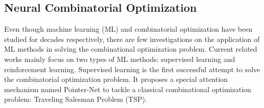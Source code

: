 \subsection{Neural Combinatorial Optimization}
\label{sec:nco_related}
Even though machine learning (ML) and combinatorial optimization have been studied for decades respectively, 
there are few investigations on the application of ML methods in solving the combinational optimization problem.
Current related works mainly focus on two types of ML methods: supervised learning and reinforcement learning.
Supervised learning \cite{vinyals2015pointer} is the first successful attempt to solve the combinatorial optimization problem.
It proposes a special attention mechanism named Pointer-Net to tackle a classical combinational optimization problem: Traveling Salesman Problem (TSP).
